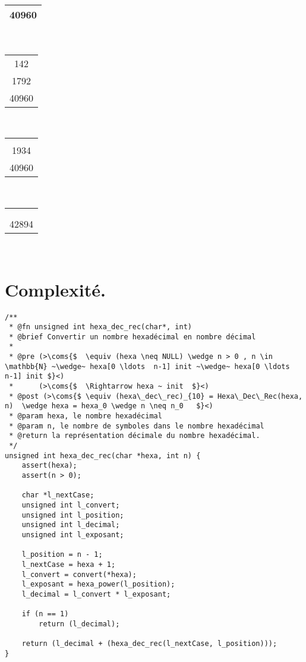 \documentclass[a4paper, 11pt, oneside]{article}
\newcommand{\coms}[1]{\textcolor{MidnightBlue}{#1}}
\begin{document}
\begin{center}
\begin{tabular}{|c|}
			40960\\
			\hline
		\end{tabular}~
		\begin{tabular}{|c|}
			\\
			142\\
			1792\\
			40960\\
			\hline
		\end{tabular}~
		\begin{tabular}{|c|}
			\\
			\\
			1934\\
			40960\\
			\hline
		\end{tabular}~
		\begin{tabular}{|c|}
			\\
			\\
			\\
			42894\\
			\hline
		\end{tabular}~
	\end{center}
	
	\newpage
		
\section{Complexité.}\label{complexite}

		\begin{lstlisting}[caption={hexa\_dec\_rec()}]
/**
 * @fn unsigned int hexa_dec_rec(char*, int)
 * @brief Convertir un nombre hexadécimal en nombre décimal
 *
 * @pre (>\coms{$  \equiv (hexa \neq NULL) \wedge n > 0 , n \in \mathbb{N} ~\wedge~ hexa[0 \ldots  n-1] init ~\wedge~ hexa[0 \ldots  n-1] init $}<)
 * 		(>\coms{$  \Rightarrow hexa ~ init	$}<)
 * @post (>\coms{$ \equiv (hexa\_dec\_rec)_{10} = Hexa\_Dec\_Rec(hexa, n)  \wedge hexa = hexa_0 \wedge n \neq n_0	$}<)
 * @param hexa, le nombre hexadécimal
 * @param n, le nombre de symboles dans le nombre hexadécimal
 * @return la représentation décimale du nombre hexadécimal.
 */
unsigned int hexa_dec_rec(char *hexa, int n) {
	assert(hexa);
	assert(n > 0);

	char *l_nextCase;
	unsigned int l_convert;
	unsigned int l_position;
	unsigned int l_decimal;
	unsigned int l_exposant;

	l_position = n - 1;
	l_nextCase = hexa + 1;
	l_convert = convert(*hexa);
	l_exposant = hexa_power(l_position);
	l_decimal = l_convert * l_exposant;

	if (n == 1)
		return (l_decimal);

	return (l_decimal + (hexa_dec_rec(l_nextCase, l_position)));
}

		\end{lstlisting}
\end{document}
